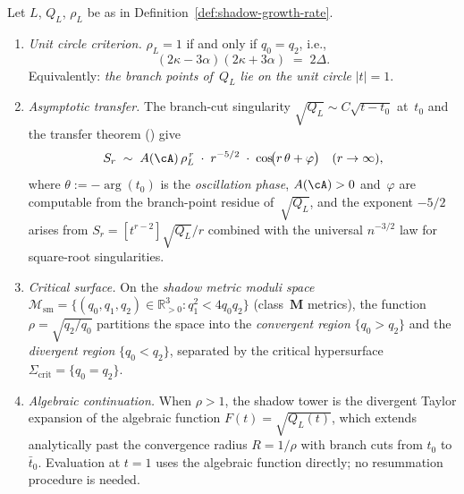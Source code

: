 \begin{theorem}
\label{thm:shadow-radius}
\label{thm:vieta-shadow-growth}
\ClaimStatusProvedHere
{}
Let $L$, $Q_L$, $\rho_L$ be as in
Definition~\textup{\ref{def:shadow-growth-rate}}.
\begin{enumerate}[label=\textup{(\roman*)}]
\item \emph{Unit circle criterion.}\enspace
  $\rho_L = 1$ if and only if $q_0 = q_2$, i.e.,
  \begin{equation}\label{eq:unit-circle-criterion}
    (2\kappa - 3\alpha)(2\kappa + 3\alpha)
    \;=\; 2\Delta.
  \end{equation}
  Equivalently: \emph{the branch points of~$Q_L$
  lie on the unit circle} $|t| = 1$.

\item \emph{Asymptotic transfer.}\enspace
  The branch-cut singularity
  $\sqrt{Q_L} \sim C\sqrt{t{-}t_0}$ at~$t_0$
  and the transfer theorem
  \textup{(}\cite[Thm.~VI.1]{FlajoletSedgewick}\textup{)}
  give
  \begin{equation}\label{eq:shadow-asymptotics}
    S_r
    \;\sim\;
    A(\cA)\,\rho_L^{\,r}
    \;\cdot\;
    r^{-5/2}
    \;\cdot\;
    \cos\!\bigl(r\,\theta + \varphi\bigr)
    \quad(r \to \infty),
  \end{equation}
  where $\theta := -\arg(t_0)$ is the
  \emph{oscillation phase},
  $A(\cA) > 0$ and~$\varphi$ are computable from the
  branch-point residue of~$\sqrt{Q_L}$, and the
  exponent $-5/2$ arises from
  $S_r = [t^{r-2}]\sqrt{Q_L}/r$ combined with the
  universal $n^{-3/2}$ law for square-root singularities.

\item \emph{Critical surface.}\enspace
  On the \emph{shadow metric moduli space}
  $\mathcal{M}_{\mathrm{sm}} =
  \{(q_0, q_1, q_2) \in \mathbb{R}^3_{>0} :
  q_1^2 < 4q_0 q_2\}$
  \textup{(}class~$\mathbf{M}$ metrics\textup{)}, the
  function $\rho = \sqrt{q_2/q_0}$ partitions the space
  into the \emph{convergent region}
  $\{q_0 > q_2\}$ and the \emph{divergent region}
  $\{q_0 < q_2\}$,
  separated by the critical hypersurface
  $\Sigma_{\mathrm{crit}} = \{q_0 = q_2\}$.

\item \emph{Algebraic continuation.}\enspace
  When $\rho > 1$, the shadow tower is the divergent
  Taylor expansion of the algebraic function
  $F(t) = \sqrt{Q_L(t)}$, which extends analytically
  past the convergence radius $R = 1/\rho$
  with branch cuts from $t_0$ to $\bar{t}_0$.
  Evaluation at $t = 1$ uses the algebraic function
  directly; no resummation procedure is needed.
\end{enumerate}
\end{theorem}


